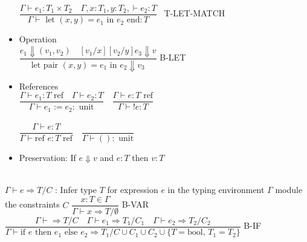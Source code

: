 \documentclass[12pt]{article}
\begin{document}
\begin{multicols}{2}
\begin{itemize}[noitemsep, nosep]
    $\dfrac{\Gamma \vdash e_1: T_1 \times T_2 \quad \Gamma, x: T_1, y: T_2, \vdash e_2: T}{\Gamma \vdash \text{ let } (x, y) = e_1 \text{ in } e_2 \text{ end}: T}$ \, T-LET-MATCH
    \item Operation \\
    $\dfrac{e_1 \Downarrow (v_1, v_2) \quad [v_1/x][v_2/y]e_3 \Downarrow v}{\text{let pair } (x, y) = e_1 \text{ in } e_2 \Downarrow v_3}$ B-LET
    \item References \\
    \vspace{1mm}
    $\dfrac{\Gamma \vdash e_1 : T \text{ ref} \quad \Gamma \vdash e_2 : T}{\Gamma \vdash e_1 := e_2 : \text{ unit}} \quad 
    \dfrac{\Gamma \vdash e : T \text{ ref}}{\Gamma \vdash !e : T}$ \\~\\
    $\dfrac{\Gamma \vdash e : T}{\Gamma \vdash \text{ref } e : T \text{ ref}} \quad
    \dfrac{}{\Gamma \vdash ()  : \text{ unit}}$
    \item Preservation: If $e \Downarrow v$ and $e : T$ then $v : T$
    
\end{itemize}
~\\
$\Gamma \vdash e \Rightarrow T/C$ : Infer type $T$ for expression $e$ in the typing environment $\Gamma$ module the constraints $C$
\vspace{1mm}
$\dfrac{x : T \in \Gamma}{\Gamma \vdash x \Rightarrow T/\emptyset}$ B-VAR
$\dfrac{\Gamma \vdash \Rightarrow T/C \quad \Gamma \vdash e_1 \Rightarrow T_1/C_1 \quad \Gamma \vdash e_2 \Rightarrow T_2/C_2}{\Gamma \vdash \text{if } e \text{ then } e_1 \text{ else } e_2 \Rightarrow T_1/C \cup C_1 \cup C_2 \cup \{T = \text{bool, } T_1 = T_2\}}$ B-IF

\end{multicols}
\end{document}
